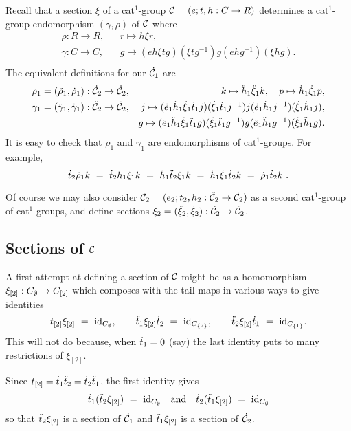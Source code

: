 \bigskip
Recall that a section $\xi$ of a cat$^1$-group 
$\mathcal{C} = (e;t,h : C \to R)$ determines a cat$^1$-group endomorphism 
$(\gamma,\rho)$ of $\mathcal{C}$ where
\begin{eqnarray*}
  \rho : R \to R, && r \mapsto h \xi r, \\
\gamma : C \to C, && g \mapsto (eh \xi tg)(\xi tg^{-1})g(ehg^{-1})(\xi hg). \\
\end{eqnarray*}
The equivalent definitions for our $\dot{\mathcal{C}}_1$ are
\begin{eqnarray*}
\rho_1 = (\ddot{\rho}_1,\dot{\rho}_1): \dot{\mathcal{C}}_2 \to \dot{\mathcal{C}}_2, 
  & &  k \mapsto \ddot{h}_1 \ddot{\xi}_1 k, \quad
       p \mapsto \dot{h}_1 \dot{\xi}_1 p, \\
\gamma_1 = (\ddot{\gamma}_1,\dot{\gamma}_1) : \ddot{\mathcal{C}}_2 \to \ddot{\mathcal{C}}_2, 
  & &  j \mapsto (\dot{e}_1\dot{h}_1\dot{\xi}_1\dot{t}_1 j)(\dot{\xi}_1\dot{t}_1 j^{-1})j
                 (\dot{e}_1\dot{h}_1 j^{-1})(\dot{\xi}_1\dot{h}_1 j), \\
  & &  g \mapsto (\ddot{e}_1\ddot{h}_1\ddot{\xi}_1\ddot{t}_1 g)(\ddot{\xi}_1\ddot{t}_1 g^{-1})g
                 (\ddot{e}_1\ddot{h}_1 g^{-1})(\ddot{\xi}_1\ddot{h}_1 g).
\end{eqnarray*}
It is easy to check that $\rho_1$ and $\gamma_1$ are endomorphisms 
of cat$^1$-groups.  For example,
$$
\dot{t}_2\ddot{\rho}_1 k ~=~
\dot{t}_2\ddot{h}_1\ddot{\xi}_1 k ~=~
\dot{h}_1\ddot{t}_2\ddot{\xi}_1 k ~=~
\dot{h}_1\dot{\xi}_1\dot{t}_2 k ~=~
\dot{\rho}_1\dot{t}_2 k~.
$$

Of course we may also consider 
$\mathcal{C}_2 = (e_2;t_2,h_2 : \ddot{\mathcal{C}}_2 \to \dot{\mathcal{C}}_2)$ 
as a second cat$^1$-group of cat$^1$-groups, and define 
sections $\xi_2 = (\ddot{\xi}_2,\dot{\xi}_2) : \dot{\mathcal{C}}_2 \to \ddot{\mathcal{C}}_2$.



\subsection{Sections of $\mathcal{C}$}

A first attempt at defining a section of $\mathcal{C}$ 
might be as a homomorphism $\xi_{[2]} : C_{\emptyset} \to C_{[2]}$ 
which composes with the tail maps in various ways to give identities
$$
t_{[2]}\xi_{[2]} ~=~ \mathrm{id}_{C_{\emptyset}}, \qquad
\ddot{t}_1\xi_{[2]}\dot{t}_2 ~=~ \mathrm{id}_{C_{\{2\}}}, \qquad
\ddot{t}_2\xi_{[2]}\dot{t}_1 ~=~ \mathrm{id}_{C_{\{1\}}}.
$$
This will not do because, when $\dot{t}_1 = 0$ (say)
the last identity puts to many restrictions of $\xi_{[2]}$.

\noindent
Since $t_{[2]} = \dot{t}_1\ddot{t}_2 = \dot{t}_2\ddot{t}_1$, the first identity gives 
$$
\dot{t}_1(\ddot{t}_2\xi_{[2]})  ~=~ \mathrm{id}_{C_{\emptyset}}
\quad\mbox{and}\quad
\dot{t}_2(\ddot{t}_1\xi_{[2]})  ~=~ \mathrm{id}_{C_{\emptyset}}
$$
so that $\ddot{t}_2\xi_{[2]}$ is a section of $\dot{\mathcal{C}}_1$ 
and $\ddot{t}_1\xi_{[2]}$ is a section of $\dot{\mathcal{C}}_2$.

